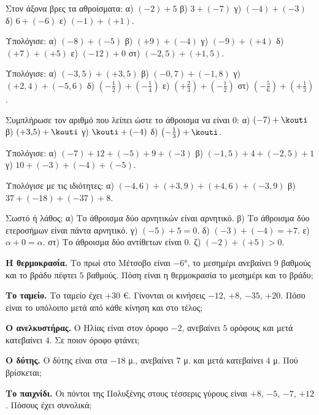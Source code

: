 

\ex Στον άξονα βρες τα αθροίσματα: α) $(-2)+5$ \quad β) $3+(-7)$ \quad γ) $(-4)+(-3)$ \quad δ) $6+(-6)$ \quad ε) $(-1)+(+1)$.

\ex Υπολόγισε: α) $(-8)+(-5)$ \quad β) $(+9)+(-4)$ \quad γ) $(-9)+(+4)$ \quad δ) $(+7)+(+5)$ \quad ε) $(-12)+0$ \quad στ) $(-2{,}5)+(+1{,}5)$.

\ex Υπολόγισε: α) $(-3{,}5)+(+3{,}5)$ \quad β) $(-0{,}7)+(-1{,}8)$ \quad γ) $(+2{,}4)+(-5{,}6)$ \quad δ) $\left(-\frac{1}{2}\right)+\left(-\frac{1}{4}\right)$ \quad ε) $\left(+\frac{2}{3}\right)+\left(-\frac{1}{2}\right)$ \quad στ) $\left(-\frac{5}{6}\right)+\left(+\frac{1}{3}\right)$.

\ex Συμπλήρωσε τον αριθμό που λείπει ώστε το άθροισμα να είναι $0$: α) $(-7)+\kouti$ \quad β) $(+3{,}5)+\kouti$ \quad γ) $\kouti+(-4)$ \quad δ) $\left(-\frac{1}{3}\right)+\kouti$.

\ex Υπολόγισε: α) $(-7)+12+(-5)+9+(-3)$ \quad β) $(-1{,}5)+4+(-2{,}5)+1$ \quad γ) $10+(-3)+(-4)+(-5)$.

\ex Υπολόγισε με τις ιδιότητες: α) $(-4{,}6)+(+3{,}9)+(+4{,}6)+(-3{,}9)$ \quad β) $37+(-18)+(-37)+8$.

\ex Σωστό ή λάθος; α) Το άθροισμα δύο αρνητικών είναι αρνητικό. \quad β) Το άθροισμα δύο ετεροσήμων είναι πάντα αρνητικό. \quad γ) $(-5)+5=0$. \quad δ) $(-3)+(-4)=+7$. \quad ε) $\alpha+0=\alpha$. \quad στ) Το άθροισμα δύο αντίθετων είναι $0$. \quad ζ) $(-2)+(+5)>0$.


\ex \textbf{Η θερμοκρασία.} Το πρωί στο Μέτσοβο είναι $-6$°, το μεσημέρι ανεβαίνει $9$ βαθμούς και το βράδυ πέφτει $5$ βαθμούς. Πόση είναι η θερμοκρασία το μεσημέρι και το βράδυ;

\ex \textbf{Το ταμείο.} Το ταμείο έχει $+30$ €. Γίνονται οι κινήσεις $-12$, $+8$, $-35$, $+20$. Πόσο είναι το υπόλοιπο μετά από κάθε κίνηση και στο τέλος;

\ex \textbf{Ο ανελκυστήρας.} Ο Ηλίας είναι στον όροφο $-2$, ανεβαίνει $5$ ορόφους και μετά κατεβαίνει $4$. Σε ποιον όροφο φτάνει;

\ex \textbf{Ο δύτης.} Ο δύτης είναι στα $-18$ μ., ανεβαίνει $7$ μ. και μετά κατεβαίνει $4$ μ. Πού βρίσκεται;

\ex \textbf{Το παιχνίδι.} Οι πόντοι της Πολυξένης στους τέσσερις γύρους είναι $+8$, $-5$, $-7$, $+12$. Πόσους έχει συνολικά;

